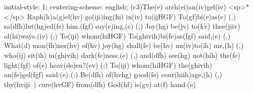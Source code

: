initial-style: 1;
centering-scheme: english;
(c3)The(e) arch(ei)an(iv)gel(iv) <sp>*</sp> Raph(h)a(g)el(hv) go(iji)ing(hi) in(iv) to(ijHGF) To(gf)bi(e)as(e) (,) sa(dfh)lut(hg)ed(fe) him,(fgf) say(e)ing,(e) (;) Joy(hg) be(jv) to(kv) thee(jiiv) al(hi)ways.(iv) (;) To(iji) whom(hiHGF) To(ghivih)bi(fe)as(fgf) said,(e) (,) What(d) man(fh)ner(hv) of(hv) joy(hg) shall(fe) be(hv) un(iv)to(ih) me,(h) (,) who(ij) sit(ih) in(ghivih) dark(fe)ness,(e) (,) and(dfh) see(hg) not(hih) the(fe) light(fgf) of(e) heav(de)en?(ev) (;) To(iji) whom(hiHGF) the(ghivih) an(fe)gel(fgf) said:(e) (;) Be(dfh) of(hvhg) good(fe) cour(hiih)age,(h) (,) thy(hviji~) cure(hvGF) from(dfh) God(hf) is(gv) at(f) hand.(e)

